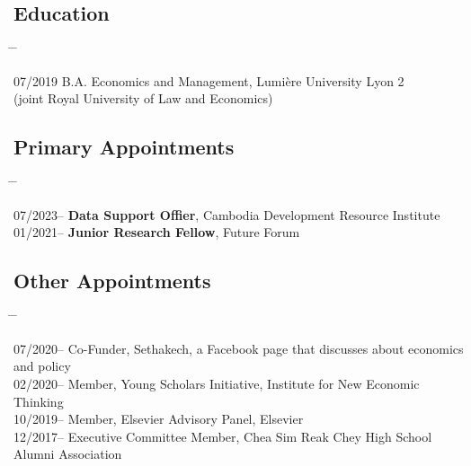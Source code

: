 \documentclass[10pt,a4paper]{article}
\newcommand{\tabbedblock}[1]{

	\begin{tabbing}
		\hspace{3cm} \= \hspace{4cm} \= \kill
		#1
	\end{tabbing}
}
\begin{document}
\subsection*{Education}

\tabbedblock{
	07/2019 \> B.A. Economics and Management, Lumière University Lyon 2\\
	\>(joint Royal University of Law and Economics)
}


\subsection*{Primary Appointments}	

\tabbedblock{
		07/2023--  \> \textbf{Data Support Offier}, Cambodia Development Resource Institute \\
	
		01/2021--  \> \textbf{Junior Research Fellow}, Future Forum \\
}
	
\vspace{-2em}	
\subsection*{Other Appointments}

\tabbedblock{


	07/2020-- \> Co-Funder, Sethakech, a Facebook page that discusses about economics and policy\\

	02/2020-- \> Member, Young Scholars Initiative, Institute for New Economic Thinking\\

	10/2019-- \> Member, Elsevier Advisory Panel, Elsevier\\


	12/2017-- \> Executive Committee Member, Chea Sim Reak Chey High School Alumni Association
}
	
\end{document}
